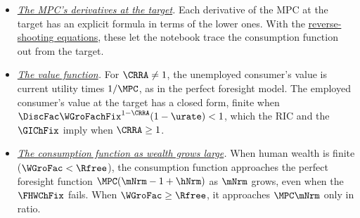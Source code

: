 \documentclass{econark}
\begin{document}
\begin{itemize}
\item \emph{\hyperref[sec:TractableBufferStock-MPCDerivatives]{The MPC's derivatives at the target}.}  Each derivative of the MPC at the target has an explicit formula in terms of the lower ones.  With the \hyperref[sec:TractableBufferStock-ReverseShooting]{reverse-shooting equations}, these let the notebook trace the consumption function out from the target.
\item \emph{\hyperref[sec:TractableBufferStock-ValueFunction]{The value function}.}  For $\CRRA \neq 1$, the unemployed consumer's value is current utility times $1/\MPC$, as in the perfect foresight model.  The employed consumer's value at the target has a closed form, finite when $\DiscFac\WGroFachFix^{1-\CRRA}(1-\urate) < 1$, which the RIC and the $\GIChFix$ imply when $\CRRA \geq 1$.
\item \emph{\hyperref[sec:PGroGEQRfree]{The consumption function as wealth grows large}.}  When human wealth is finite ($\WGroFac < \Rfree$), the consumption function approaches the perfect foresight function $\MPC(\mNrm-1+\hNrm)$ as $\mNrm$ grows, even when the $\FHWChFix$ fails.  When $\WGroFac \geq \Rfree$, it approaches $\MPC\mNrm$ only in ratio.
\end{itemize}

\pagebreak


\end{document}
